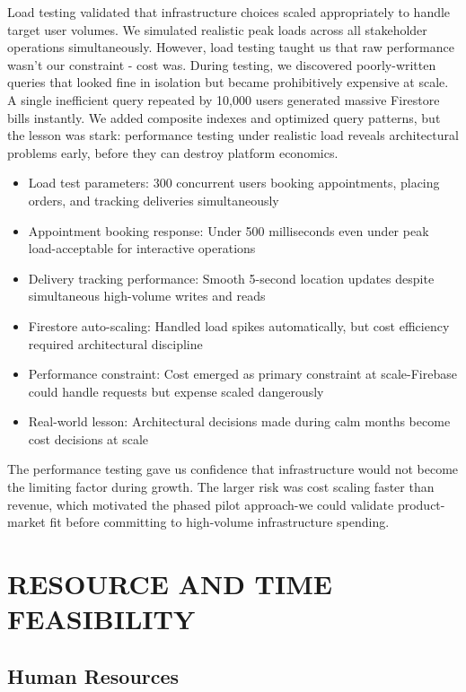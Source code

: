 \documentclass[12pt,a4paper]{report}
\begin{document}
Load testing validated that infrastructure choices scaled appropriately to handle target user volumes. We simulated realistic peak loads across all stakeholder operations simultaneously. However, load testing taught us that raw performance wasn't our constraint - cost was. During testing, we discovered poorly-written queries that looked fine in isolation but became prohibitively expensive at scale. A single inefficient query repeated by 10,000 users generated massive Firestore bills instantly. We added composite indexes and optimized query patterns, but the lesson was stark: performance testing under realistic load reveals architectural problems early, before they can destroy platform economics.

\begin{itemize}
  \item Load test parameters: 300 concurrent users booking appointments, placing orders, and tracking deliveries simultaneously
  \item Appointment booking response: Under 500 milliseconds even under peak load-acceptable for interactive operations
  \item Delivery tracking performance: Smooth 5-second location updates despite simultaneous high-volume writes and reads
  \item Firestore auto-scaling: Handled load spikes automatically, but cost efficiency required architectural discipline
  \item Performance constraint: Cost emerged as primary constraint at scale-Firebase could handle requests but expense scaled dangerously
  \item Real-world lesson: Architectural decisions made during calm months become cost decisions at scale
\end{itemize}

The performance testing gave us confidence that infrastructure would not become the limiting factor during growth. The larger risk was cost scaling faster than revenue, which motivated the phased pilot approach-we could validate product-market fit before committing to high-volume infrastructure spending.

\section{RESOURCE AND TIME FEASIBILITY}

\subsection{Human Resources}
\end{document}
